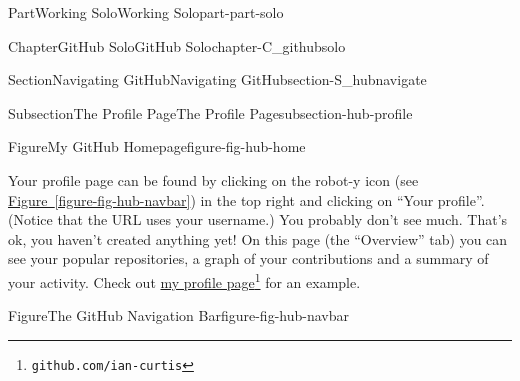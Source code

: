 \documentclass[oneside,10pt,]{book}
\newcommand{\xreffont}{\relax}
\begin{document}
\begin{partptx}{Part}{Working Solo}{}{Working Solo}{}{}{part-part-solo}
\begin{chapterptx}{Chapter}{GitHub Solo}{}{GitHub Solo}{}{}{chapter-C_githubsolo}
\begin{sectionptx}{Section}{Navigating GitHub}{}{Navigating GitHub}{}{}{section-S_hubnavigate}
\begin{subsectionptx}{Subsection}{The Profile Page}{}{The Profile Page}{}{}{subsection-hub-profile}
\begin{figureptx}{Figure}{My GitHub Homepage}{figure-fig-hub-home}{}
\begin{image}{0.05}{0.9}{0.05}{}
\end{image}%
\tcblower
\end{figureptx}%
Your profile page can be found by clicking on the robot-y icon (see \hyperref[figure-fig-hub-navbar]{Figure~{\xreffont\ref{figure-fig-hub-navbar}}}) in the top right and clicking on ``Your profile''. (Notice that the URL uses your username.) You probably don't see much. That's ok, you haven't created anything yet! On this page (the ``Overview'' tab) you can see your popular repositories, a graph of your contributions and a summary of your activity. Check out \href{https://github.com/ian-curtis}{my profile page}\footnote{\nolinkurl{github.com/ian-curtis}\label{fn-hub-profile-i-e}} for an example.%
\begin{figureptx}{Figure}{The GitHub Navigation Bar}{figure-fig-hub-navbar}{}%
\begin{image}{0.35}{0.3}{0.35}{}%

\end{image}
\end{figureptx}
\end{subsectionptx}
\end{sectionptx}
\end{chapterptx}
\end{partptx}
\end{document}
